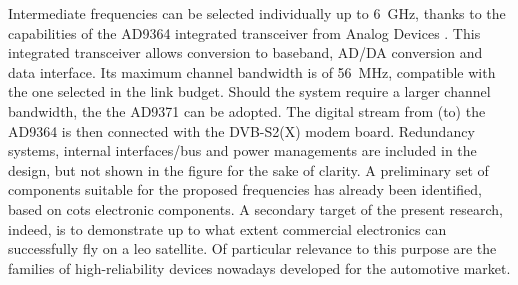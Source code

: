 \documentclass[conference,10pt,a4paper]{IEEEtran}%
\begin{document}
Intermediate frequencies can be selected individually up to \SI{6}{GHz}, thanks to the capabilities of the AD9364 integrated transceiver from Analog Devices \cite{analog}.
This integrated transceiver allows conversion to baseband, AD/DA conversion and data interface.
Its maximum channel bandwidth is of \SI{56}{MHz}, compatible with the one selected in the link budget.
Should the system require a larger channel bandwidth, the the AD9371 can be adopted.
The digital stream from (to) the AD9364 is then connected with the DVB-S2(X) modem board.
Redundancy systems, internal interfaces/bus and power managements are included in the design, but not shown in the figure for the sake of clarity.
A preliminary set of components suitable for the proposed frequencies has already been identified, based on \ac{cots} electronic components.
A secondary target of the present research, indeed, is to demonstrate up to what extent commercial electronics can successfully fly on a \ac{leo} satellite.
Of particular relevance to this purpose are the families of high-reliability devices nowadays developed for the automotive market.

\end{document}

